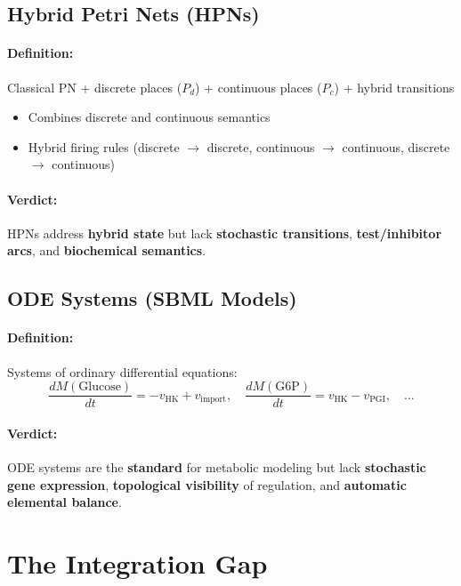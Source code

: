 \subsection{Hybrid Petri Nets (HPNs)}
\label{subsec:hybrid-pn}

\paragraph{Definition:} Classical PN + discrete places ($P_d$) + continuous places ($P_c$) + hybrid transitions
\begin{itemize}
    \item Combines discrete and continuous semantics
    \item Hybrid firing rules (discrete $\to$ discrete, continuous $\to$ continuous, discrete $\to$ continuous)
\end{itemize}

\paragraph{Verdict:} HPNs address \textbf{hybrid state} but lack \textbf{stochastic transitions}, \textbf{test/inhibitor arcs}, and \textbf{biochemical semantics}.

\subsection{ODE Systems (SBML Models)}
\label{subsec:ode-systems}

\paragraph{Definition:} Systems of ordinary differential equations:
\begin{equation}
\frac{dM(\text{Glucose})}{dt} = -v_{\text{HK}} + v_{\text{import}}, \quad \frac{dM(\text{G6P})}{dt} = v_{\text{HK}} - v_{\text{PGI}}, \quad \ldots
\end{equation}

\paragraph{Verdict:} ODE systems are the \textbf{standard} for metabolic modeling but lack \textbf{stochastic gene expression}, \textbf{topological visibility} of regulation, and \textbf{automatic elemental balance}.

\section{The Integration Gap}
\label{sec:integration-gap}

